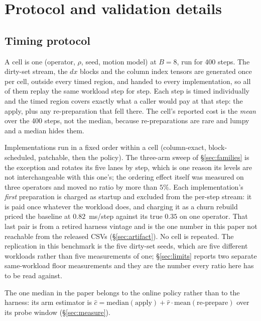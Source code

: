 \documentclass{article}
\begin{document}



\appendix

\section{Protocol and validation details}
\label{app:protocol}

\subsection{Timing protocol}
\label{sec:timing}

A cell is one (operator, $\rho$, seed, motion model) at $B{=}8$, run for 400
steps. The dirty-set stream, the $dx$ blocks and the column index tensors are
generated once per cell, outside every timed region, and handed to every
implementation, so all of them replay the same workload step for step. Each step
is timed individually and the timed region covers exactly what a caller would
pay at that step: the apply, plus any re-preparation that fell there. The cell's
reported cost is the \emph{mean} over the 400 steps, not the median, because
re-preparations are rare and lumpy and a median hides them.

Implementations run in a fixed order within a cell (column-exact,
block-scheduled, patchable, then the policy). The three-arm sweep of
\S\ref{sec:families} is the exception and rotates its five lanes by step, which
is one reason its levels are not interchangeable with this one's; the ordering
effect itself was measured on three operators and moved no ratio by more than
$5\%$. Each implementation's \emph{first}
preparation is charged as startup and excluded from the per-step stream: it is
paid once whatever the workload does, and charging it as a churn rebuild priced
the baseline at $0.82$~ms/step against its true $0.35$ on one operator. That
last pair is from a retired harness vintage and is the one number in this paper
not reachable from the released CSVs (\S\ref{sec:artifact}).
No cell is repeated. The replication in this benchmark is the five dirty-set
seeds, which are five different workloads rather than five measurements of one;
\S\ref{sec:limits} reports two separate same-workload floor measurements and
they are the number every ratio here has to be read against.

The one median in the paper belongs to the online policy rather than to the
harness: its arm estimator is
$\widehat{c} = \mathrm{median}(\text{apply}) + \widehat{r}\cdot
\mathrm{mean}(\text{re-prepare})$ over its probe window (\S\ref{sec:measure}).
\end{document}
